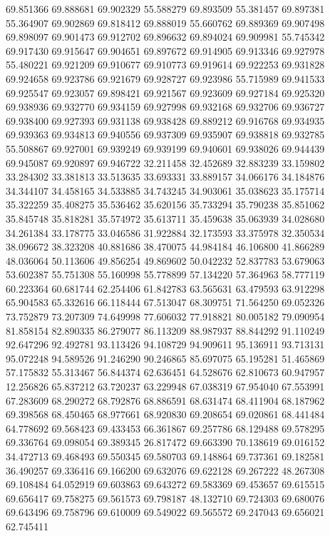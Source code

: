 69.851366
69.888681
69.902329
55.588279
69.893509
55.381457
69.897381
55.364907
69.902869
69.818412
69.888019
55.660762
69.889369
69.907498
69.898097
69.901473
69.912702
69.896632
69.894024
69.909981
55.745342
69.917430
69.915647
69.904651
69.897672
69.914905
69.913346
69.927978
55.480221
69.921209
69.910677
69.910773
69.919614
69.922253
69.931828
69.924658
69.923786
69.921679
69.928727
69.923986
55.715989
69.941533
69.925547
69.923057
69.898421
69.921567
69.923609
69.927184
69.925320
69.938936
69.932770
69.934159
69.927998
69.932168
69.932706
69.936727
69.938400
69.927393
69.931138
69.938428
69.889212
69.916768
69.934935
69.939363
69.934813
69.940556
69.937309
69.935907
69.938818
69.932785
55.508867
69.927001
69.939249
69.939199
69.940601
69.938026
69.944439
69.945087
69.920897
69.946722
32.211458
32.452689
32.883239
33.159802
33.284302
33.381813
33.513635
33.693331
33.889157
34.066176
34.184876
34.344107
34.458165
34.533885
34.743245
34.903061
35.038623
35.175714
35.322259
35.408275
35.536462
35.620156
35.733294
35.790238
35.851062
35.845748
35.818281
35.574972
35.613711
35.459638
35.063939
34.028680
34.261384
33.178775
33.046586
31.922884
32.173593
33.375978
32.350534
38.096672
38.323208
40.881686
38.470075
44.984184
46.106800
41.866289
48.036064
50.113606
49.856254
49.869602
50.042232
52.837783
53.679063
53.602387
55.751308
55.160998
55.778899
57.134220
57.364963
58.777119
60.223364
60.681744
62.254406
61.842783
63.565631
63.479593
63.912298
65.904583
65.332616
66.118444
67.513047
68.309751
71.564250
69.052326
73.752879
73.207309
74.649998
77.606032
77.918821
80.005182
79.090954
81.858154
82.890335
86.279077
86.113209
88.987937
88.844292
91.110249
92.647296
92.492781
93.113426
94.108729
94.909611
95.136911
93.713131
95.072248
94.589526
91.246290
90.246865
85.697075
65.195281
51.465869
57.175832
55.313467
56.844374
62.636451
64.528676
62.810673
60.947957
12.256826
65.837212
63.720237
63.229948
67.038319
67.954040
67.553991
67.283609
68.290272
68.792876
68.886591
68.631474
68.411904
68.187962
69.398568
68.450465
68.977661
68.920830
69.208654
69.020861
68.441484
64.778692
69.568423
69.433453
66.361867
69.257786
68.129488
69.578295
69.336764
69.098054
69.389345
26.817472
69.663390
70.138619
69.016152
34.472713
69.468493
69.550345
69.580703
69.148864
69.737361
69.182581
36.490257
69.336416
69.166200
69.632076
69.622128
69.267222
48.267308
69.108484
64.052919
69.603863
69.643272
69.583369
69.453657
69.615515
69.656417
69.758275
69.561573
69.798187
48.132710
69.724303
69.680076
69.643496
69.758796
69.610009
69.549022
69.565572
69.247043
69.656021
62.745411
